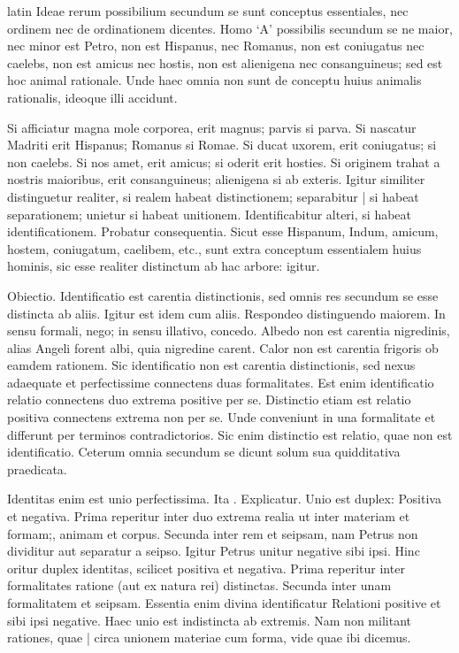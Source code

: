 \begin{otherlanguage*}{latin}
\pstart
Ideae rerum possibilium secundum se sunt conceptus essentiales, nec ordinem nec de ordinationem dicentes. Homo `A' possibilis secundum se ne maior, nec minor est Petro, non est Hispanus, nec Romanus, non est coniugatus nec caelebs, non est amicus nec hostis, non est alienigena nec consanguineus; sed est hoc animal rationale. Unde haec omnia non sunt de conceptu huius animalis rationalis, ideoque illi accidunt. 
\pend

\pstart
Si afficiatur magna mole corporea, erit magnus; parvis si parva. Si nascatur Madriti erit Hispanus; Romanus si Romae. Si ducat uxorem, erit coniugatus; si non caelebs. Si nos amet, erit amicus; si oderit erit hosties. Si originem trahat a nostris maioribus, erit consanguineus; alienigena si ab exteris. Igitur similiter distinguetur realiter, si realem habeat distinctionem; separabitur \textnormal{|} si habeat separationem; unietur si habeat unitionem. Identificabitur alteri, si habeat identificationem. Probatur consequentia. Sicut esse Hispanum, Indum, amicum, hostem, coniugatum, caelibem, etc., sunt extra conceptum essentialem huius hominis, sic esse realiter distinctum ab hac arbore:
igitur. 
\pend

\pstart
Obiectio. Identificatio est carentia distinctionis, sed omnis res secundum se esse distincta ab  aliis. Igitur est idem cum aliis. Respondeo distinguendo maiorem. In sensu formali, nego; in sensu illativo, concedo. Albedo non est carentia nigredinis, alias Angeli forent albi, quia nigredine carent. Calor non est carentia frigoris ob eamdem rationem. Sic identificatio non est carentia distinctionis, sed nexus adaequate et perfectissime connectens duas formalitates. Est enim identificatio relatio connectens duo extrema positive per se. Distinctio etiam est relatio positiva connectens extrema non per se. Unde conveniunt in una formalitate et differunt per terminos contradictorios. Sic enim distinctio est relatio, quae non est identificatio. Ceterum omnia secundum se dicunt solum sua quidditativa praedicata. 
\pend

\pstart
Identitas enim est unio perfectissima. Ita . Explicatur. Unio est duplex:
Positiva et negativa. Prima reperitur inter duo extrema realia ut inter materiam et formam;, animam et corpus. Secunda inter rem et seipsam, nam Petrus non dividitur aut separatur a seipso. Igitur Petrus unitur negative sibi ipsi. Hinc oritur duplex identitas, scilicet positiva et negativa. Prima reperitur inter formalitates ratione (aut ex natura rei) distinctas. Secunda inter unam formalitatem et seipsam. Essentia enim divina identificatur Relationi positive et sibi ipsi negative. Haec unio est indistincta ab extremis. Nam non militant rationes, quae \textnormal{|} circa unionem materiae cum forma, vide quae ibi dicemus. 
\pend


\end{otherlanguage*}
